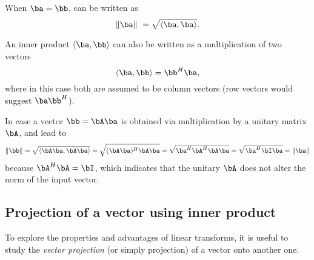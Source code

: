 When $\ba=\bb$,  can be written as
\begin{equation}
\lVert\ba\rVert\ = \sqrt{\langle\ba, \ba\rangle}.
\label{eq:norm2InnerProduct}
\end{equation}

An inner product $\langle\ba, \bb\rangle$ can also be written as a multiplication of two vectors
\begin{equation}
\langle\ba, \bb\rangle = \bb^H \ba,
\label{eq:innerProductAsVectorMultiplication}
\end{equation}
where in this case both are assumed to be column vectors (row vectors would suggest $\ba \bb^H$).

In case a vector $\bb = \bA \ba$ is obtained via multiplication by a unitary matrix $\bA$,  and  lead to
\begin{equation}
\lVert\bb\rVert = \sqrt{\langle\bA\ba, \bA\ba\rangle} = 
\sqrt{(\bA\ba)^H \bA\ba} = \sqrt{\ba^H \bA^H \bA\ba} =  \sqrt{\ba^H \bI \ba} = \lVert \ba \rVert
\label{eq:parsevalViaInnerProduct}
\end{equation}
because $\bA^H \bA=\bI$, which indicates that the unitary $\bA$ does not alter the norm of the input vector.

\subsection{Projection of a vector using inner product}
\label{sec:projection}

To explore the properties and advantages of linear transforms, it is useful to study the \emph{vector projection} (or simply projection) of a vector onto another one.


